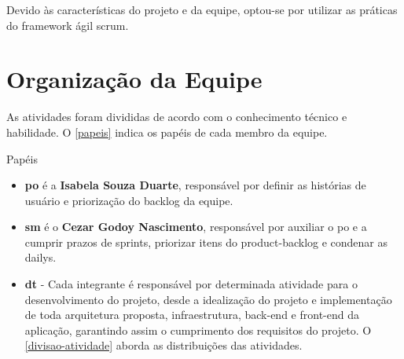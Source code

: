   Devido às características do projeto e da equipe, optou-se por utilizar as práticas do framework ágil \gls{scrum}. 

\section{Organização da Equipe}
As atividades foram divididas de acordo com o conhecimento técnico e habilidade. O \autoref{papeis} indica os papéis de cada membro da equipe.

\begin{quadro}[H]
	\centering\footnotesize
    \ABNTEXfontereduzida
    \caption{Papéis}
    \label{papeis}
\end{quadro}

\begin{itemize}
    \item \textbf{\ac{po}} é a \textbf{Isabela Souza Duarte}, responsável por definir as \gls{histórias de usuário} e priorização do \gls{backlog} da equipe.
    \item \textbf{\ac{sm}} é o \textbf{Cezar Godoy Nascimento}, responsável por auxiliar o \ac{po} e a cumprir prazos de \gls{sprints}, priorizar itens do \gls{product-backlog} e condenar as \gls{dailys}.
    \item \textbf{\ac{dt}} - Cada integrante é responsável por determinada atividade para o desenvolvimento do projeto, desde a idealização do projeto e implementação de toda arquitetura proposta, infraestrutura, \gls{back-end} e \gls{front-end} da aplicação, garantindo assim o cumprimento dos requisitos do projeto. 
    O \autoref{divisao-atividade} aborda as distribuições das atividades.
\end{itemize}


